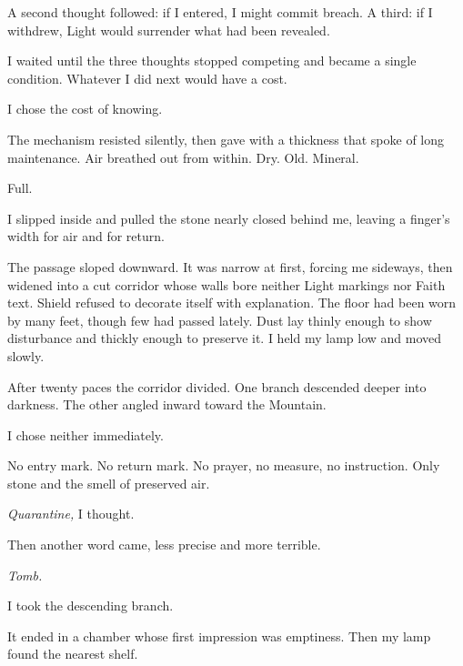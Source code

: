 A second thought followed: if I entered, I might commit breach. A third: if I withdrew, Light would surrender what had been revealed.\par

I waited until the three thoughts stopped competing and became a single condition. Whatever I did next would have a cost.\par

I chose the cost of knowing.\par

The mechanism resisted silently, then gave with a thickness that spoke of long maintenance. Air breathed out from within. Dry. Old. Mineral.\par

Full.\par

I slipped inside and pulled the stone nearly closed behind me, leaving a finger's width for air and for return.\par

The passage sloped downward. It was narrow at first, forcing me sideways, then widened into a cut corridor whose walls bore neither Light markings nor Faith text. Shield refused to decorate itself with explanation. The floor had been worn by many feet, though few had passed lately. Dust lay thinly enough to show disturbance and thickly enough to preserve it. I held my lamp low and moved slowly.\par

After twenty paces the corridor divided. One branch descended deeper into darkness. The other angled inward toward the Mountain.\par

I chose neither immediately.\par

No entry mark. No return mark. No prayer, no measure, no instruction. Only stone and the smell of preserved air.\par

\textit{Quarantine,} I thought.\par

Then another word came, less precise and more terrible.\par

\textit{Tomb.}\par

I took the descending branch.\par

It ended in a chamber whose first impression was emptiness. Then my lamp found the nearest shelf.\par


